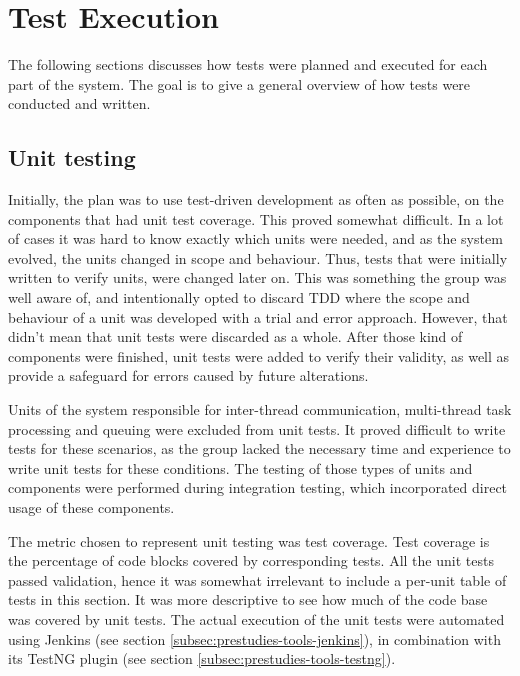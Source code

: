 \section{Test Execution}
\label{subsec:testing-test_execution}

The following sections discusses how tests were planned and executed for each part of the system. The goal is to give a general overview of how tests were conducted and written.

\subsection{Unit testing}
\label{subsec:testing-test_execution-unit_testing}

Initially, the plan was to use test-driven development as often as possible, on the components that had unit test coverage. This proved somewhat difficult. In a lot of cases it was hard to know exactly which units were needed, and as the system evolved, the units changed in scope and behaviour. Thus, tests that were initially written to verify units, were changed later on. This was something the group was well aware of, and intentionally opted to discard TDD where the scope and behaviour of a unit was developed with a trial and error approach. However, that didn't mean that unit tests were discarded as a whole. After those kind of components were finished, unit tests were added to verify their validity, as well as provide a safeguard for errors caused by future alterations.

Units of the system responsible for inter-thread communication, multi-thread task processing and queuing were excluded from unit tests. It proved difficult to write tests for these scenarios, as the group lacked the necessary time and experience to write unit tests for these conditions. The testing of those types of units and components were performed during integration testing, which incorporated direct usage of these components.

The metric chosen to represent unit testing was test coverage. Test coverage is the percentage of code blocks covered by corresponding tests. All the unit tests passed validation, hence it was somewhat irrelevant to include a per-unit table of tests in this section. It was more descriptive to see how much of the code base was covered by unit tests. The actual execution of the unit tests were automated using Jenkins (see section \ref{subsec:prestudies-tools-jenkins}), in combination with its TestNG plugin (see section \ref{subsec:prestudies-tools-testng}).


